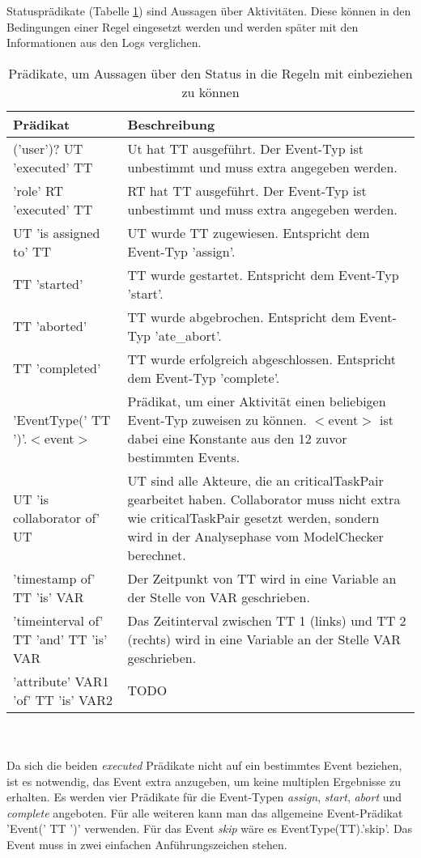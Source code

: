 Statusprädikate (Tabelle \ref{tab:status}) sind Aussagen über Aktivitäten. Diese können in den Bedingungen einer Regel eingesetzt werden und werden später mit den Informationen aus den Logs verglichen. 
\begin{table}[h]
\begin{tabular} {|p{6cm}|p{10cm}|}
\hline
\textbf{Prädikat} & \textbf{Beschreibung}\\
\hline
('user')? UT 'executed' TT      & Ut hat TT ausgeführt. Der Event-Typ ist unbestimmt und muss extra angegeben werden.\\
\hline
'role' RT 'executed' TT		& RT hat TT ausgeführt. Der Event-Typ ist unbestimmt und muss extra angegeben werden.\\
\hline
UT 'is assigned to' TT		& UT wurde TT zugewiesen. Entspricht dem Event-Typ 'assign'.\\
\hline
TT 'started'			& TT wurde gestartet. Entspricht dem Event-Typ 'start'.\\
\hline
TT 'aborted'			& TT wurde abgebrochen. Entspricht dem Event-Typ 'ate\_abort'.\\
\hline
TT 'completed'			& TT wurde erfolgreich abgeschlossen. Entspricht dem Event-Typ 'complete'. \\
\hline
'EventType(' TT ')'.$<$event$>$ 	& Prädikat, um einer Aktivität einen beliebigen Event-Typ zuweisen zu können. $<$event$>$ ist dabei eine Konstante aus den 12 zuvor bestimmten Events.\\
\hline
UT 'is collaborator of' UT	& UT sind alle Akteure, die an criticalTaskPair gearbeitet haben. Collaborator muss nicht extra wie criticalTaskPair gesetzt werden, sondern wird in der Analysephase vom ModelChecker berechnet.\\
\hline
'timestamp of' TT 'is' VAR	& Der Zeitpunkt von TT wird in eine Variable an der Stelle von VAR geschrieben.\\
\hline
'timeinterval of' TT 'and' TT 'is' VAR 	& Das Zeitinterval zwischen TT 1 (links) und TT 2 (rechts) wird in eine Variable an der Stelle VAR geschrieben.\\
\hline
'attribute' VAR1 'of' TT 'is' VAR2 & TODO\\
\hline	
\end{tabular}
\\\\\small Da sich die beiden \textit{executed} Prädikate nicht auf ein bestimmtes Event beziehen, ist es notwendig, das Event extra anzugeben, um keine multiplen Ergebnisse zu erhalten. Es werden vier Prädikate für die Event-Typen \textit{assign}, \textit{start}, \textit{abort} und \textit{complete} angeboten. Für alle weiteren kann man das allgemeine Event-Prädikat 'Event(' TT ')' verwenden. Für das Event \textit{skip} wäre es EventType(TT).'skip'. Das Event muss in zwei einfachen Anführungszeichen stehen.
\caption{Prädikate, um Aussagen über den Status in die Regeln mit einbeziehen zu können}
\label{tab:status}
\end{table}

